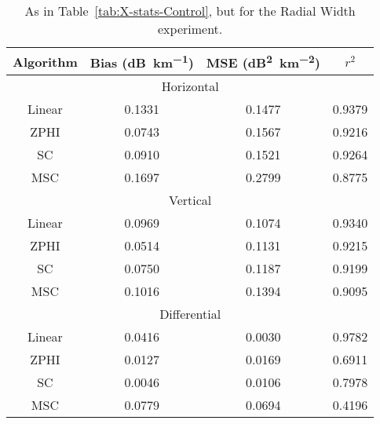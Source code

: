 \begin{table}
    \centering
    \begin{tabular}{| c | c | c | c |}
        \hline
        Algorithm & Bias (\si{dB\per \kilo\meter}) & MSE (\si{dB\squared \per \kilo\meter \squared}) & $r^2$ \\
        \hline
        \hline
        \multicolumn{4}{|c|}{Horizontal}\\
        \hline
        Linear & 0.1331 & 0.1477 & 0.9379\\
        ZPHI & 0.0743 & 0.1567 & 0.9216\\
        SC & 0.0910 & 0.1521 & 0.9264\\
        MSC & 0.1697 & 0.2799 & 0.8775\\
        \hline
        \multicolumn{4}{|c|}{Vertical}\\
        \hline
        Linear & 0.0969 & 0.1074 & 0.9340\\
        ZPHI & 0.0514 & 0.1131 & 0.9215\\
        SC & 0.0750 & 0.1187 & 0.9199\\
        MSC & 0.1016 & 0.1394 & 0.9095\\
        \hline
        \multicolumn{4}{|c|}{Differential}\\
        \hline
        Linear & 0.0416 & 0.0030 & 0.9782\\
        ZPHI & 0.0127 & 0.0169 & 0.6911\\
        SC & 0.0046 & 0.0106 & 0.7978\\
        MSC & 0.0779 & 0.0694 & 0.4196\\
\hline
    \end{tabular}
    \caption{As in Table~\ref{tab:X-stats-Control}, but for
    the Radial Width experiment.}
    \label{tab:X-stats-Radial Width}
\end{table}
